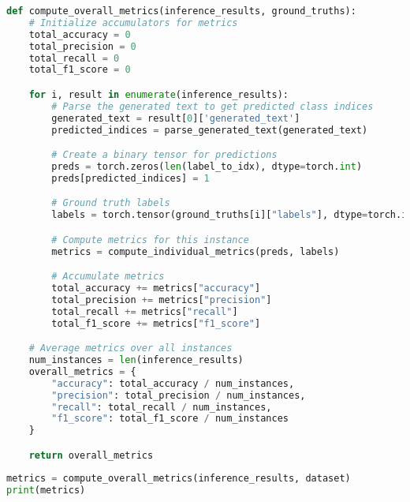 \begin{latin}
    \begin{lstlisting}[language=Python, title=\rl{تابع بدست آوردن ارزیابی مدل به ازای تمام نمونه ها}]
def compute_overall_metrics(inference_results, ground_truths):
    # Initialize accumulators for metrics
    total_accuracy = 0
    total_precision = 0
    total_recall = 0
    total_f1_score = 0

    for i, result in enumerate(inference_results):
        # Parse the generated text to get predicted class indices
        generated_text = result[0]['generated_text']
        predicted_indices = parse_generated_text(generated_text)

        # Create a binary tensor for predictions
        preds = torch.zeros(len(label_to_idx), dtype=torch.int)
        preds[predicted_indices] = 1

        # Ground truth labels
        labels = torch.tensor(ground_truths[i]["labels"], dtype=torch.int)

        # Compute metrics for this instance
        metrics = compute_individual_metrics(preds, labels)

        # Accumulate metrics
        total_accuracy += metrics["accuracy"]
        total_precision += metrics["precision"]
        total_recall += metrics["recall"]
        total_f1_score += metrics["f1_score"]

    # Average metrics over all instances
    num_instances = len(inference_results)
    overall_metrics = {
        "accuracy": total_accuracy / num_instances,
        "precision": total_precision / num_instances,
        "recall": total_recall / num_instances,
        "f1_score": total_f1_score / num_instances
    }

    return overall_metrics

\end{lstlisting}
\end{latin}


\begin{latin}
    \begin{lstlisting}[language=Python, title=\rl{ارزبابی خروجی های مدل}]
metrics = compute_overall_metrics(inference_results, dataset)
print(metrics) 
\end{lstlisting}
\end{latin}
\clearpage